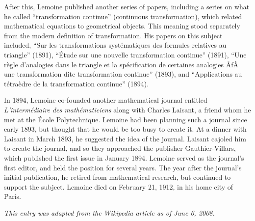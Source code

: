 \documentclass[12pt]{article}
\begin{document}
After this, Lemoine published another series of papers, including a series on what he called ``transformation continue'' (continuous transformation), which related mathematical equations to geometrical objects. This meaning stood separately from the modern definition of transformation. His papers on this subject included, ``Sur les transformations syst\'ematiques des formules relatives au triangle'' (1891), ``\'Etude sur une nouvelle transformation continue'' (1891), ``Une r\`egle d'analogies dans le triangle et la sp\'ecification de certaines analogies ÃƒÂ  une transformation dite transformation continue'' (1893), and ``Applications au t\'etra\`edre de la transformation continue'' (1894).

In 1894, Lemoine co-founded another mathematical journal entitled {\it L'interm\'ediaire des math\'ematiciens} along with Charles Laisant, a friend whom he met at the \'Ecole Polytechnique. Lemoine had been planning such a journal since early 1893, but thought that he would be too busy to create it. At a dinner with Laisant in March 1893, he suggested the idea of the journal. Laisant cajoled him to create the journal, and so they approached the publisher Gauthier-Villars, which published the first issue in January 1894. Lemoine served as the journal's first editor, and held the position for several years. The year after the journal's initial publication, he retired from mathematical research, but continued to support the subject. Lemoine died on February 21, 1912, in his home city of Paris.

{\it This entry was adapted from the Wikipedia article  as of June 6, 2008.}
\end{document}
